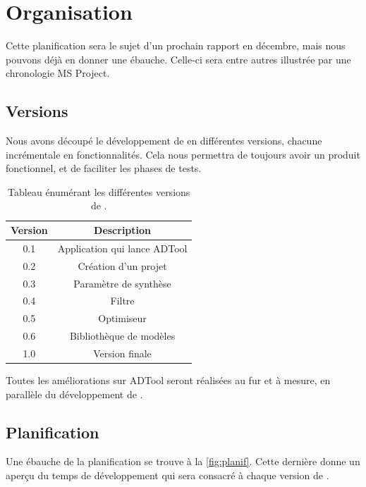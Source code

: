 \section{Organisation}
	 Cette planification sera le sujet d'un prochain rapport en décembre, mais nous pouvons déjà en donner une ébauche. Celle-ci sera entre autres illustrée par une chronologie MS Project.

	\subsection{Versions}
		Nous avons découpé le développement de \glasir{} en différentes versions, chacune incrémentale en fonctionnalités. Cela nous permettra de toujours avoir un produit fonctionnel, et de faciliter les phases de tests.

		\begin{table}[h!]
			\begin{center}
			\begin{tabular}{|c|c|}
				\hline
				Version & Description\\
				\hline
				0.1 & Application qui lance ADTool\\
				\hline
				0.2 & Création d'un projet\\
				\hline
				0.3 & Paramètre de synthèse\\
				\hline
				0.4 & Filtre\\
				\hline
				0.5 & Optimiseur\\
				\hline
				0.6 & Bibliothèque de modèles\\
				\hline
				1.0 & Version finale\\
				\hline
			\end{tabular}
			\end{center}
			\caption{Tableau énumérant les différentes versions de \glasir{}.}
		\end{table} %

		Toutes les améliorations sur ADTool seront réalisées au fur et à mesure, en parallèle du développement de \glasir{}.

	\subsection{Planification}
		Une ébauche de la planification se trouve à la {} \ref{fig:planif}. Cette dernière donne un aperçu du temps de développement qui sera consacré à chaque version de \glasir{}. 

